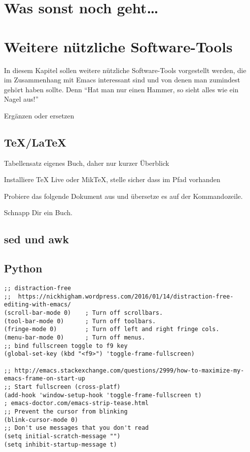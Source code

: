 \documentclass[12pt,ngerman]{scrbook}
\begin{document}
\chapter{Was sonst noch geht\ldots}


\chapter{Weitere nützliche Software-Tools}

In diesem Kapitel sollen weitere nützliche Software-Tools vorgestellt werden, die im Zusammenhang mit Emacs interessant sind und von denen man zumindest gehört haben sollte. Denn \enquote{Hat man nur einen Hammer, so sieht alles wie ein Nagel aus!}

Ergänzen oder ersetzen

\section{\TeX/\LaTeX}

Tabellensatz eigenes Buch, daher nur kurzer Überblick

Installiere TeX Live oder MikTeX, stelle sicher dass im Pfad vorhanden

Probiere das folgende Dokument aus und übersetze es auf der Kommandozeile.

Schnapp Dir ein Buch.

\section{sed und awk}


\section{Python}

\backmatter

\blindtext

\begin{lstlisting}[basicstyle=\ttfamily] % <--- here
;; distraction-free
;;  https://nickhigham.wordpress.com/2016/01/14/distraction-free-editing-with-emacs/
(scroll-bar-mode 0)    ; Turn off scrollbars.
(tool-bar-mode 0)      ; Turn off toolbars.
(fringe-mode 0)        ; Turn off left and right fringe cols.
(menu-bar-mode 0)      ; Turn off menus.
;; bind fullscreen toggle to f9 key
(global-set-key (kbd "<f9>") 'toggle-frame-fullscreen)

;; http://emacs.stackexchange.com/questions/2999/how-to-maximize-my-emacs-frame-on-start-up
;; Start fullscreen (cross-platf)
(add-hook 'window-setup-hook 'toggle-frame-fullscreen t)
; emacs-doctor.com/emacs-strip-tease.html
;; Prevent the cursor from blinking
(blink-cursor-mode 0)
;; Don't use messages that you don't read
(setq initial-scratch-message "")
(setq inhibit-startup-message t)
\end{lstlisting}
\end{document}

